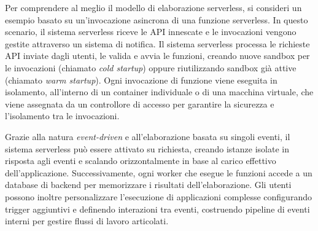 Per comprendere al meglio il modello di elaborazione serverless, si consideri un esempio basato su un'invocazione asincrona di una funzione serverless. In questo scenario, il sistema serverless riceve le API innescate e le invocazioni vengono gestite attraverso un sistema di notifica. Il sistema serverless processa le richieste API inviate dagli utenti, le valida e avvia le funzioni, creando nuove sandbox per le invocazioni (chiamato \textit{cold startup}) oppure riutilizzando sandbox già attive (chiamato \textit{warm startup}). Ogni invocazione di funzione viene eseguita in isolamento, all'interno di un container individuale o di una macchina virtuale, che viene assegnata da un controllore di accesso per garantire la sicurezza e l'isolamento tra le invocazioni.

Grazie alla natura \textit{event-driven} e all’elaborazione basata su singoli eventi, il sistema serverless può essere attivato su richiesta, creando istanze isolate in risposta agli eventi e scalando orizzontalmente in base al carico effettivo dell'applicazione. Successivamente, ogni worker che esegue le funzioni accede a un database di backend per memorizzare i risultati dell'elaborazione. Gli utenti possono inoltre personalizzare l'esecuzione di applicazioni complesse configurando trigger aggiuntivi e definendo interazioni tra eventi, costruendo pipeline di eventi interni per gestire flussi di lavoro articolati.
